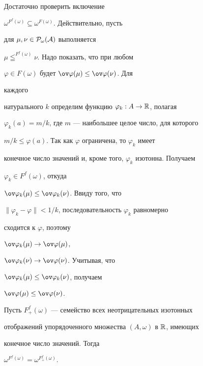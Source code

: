 \begin{pf} 


Достаточно проверить включение 


$\omega^{F^f(\omega)}\subseteq\omega^{F(\omega)}$. Действительно, пусть 


для $\mu,\nu\in\cal P_\omega(A)$ выполняется 


$\mu\leqq^{F^f(\omega)}\nu$. Надо показать, что при любом 


$\varphi\in F(\omega)$ будет $\ov\varphi(\mu)\le\ov\varphi(\nu)$. Для 


каждого 


натурального $k$ определим функцию $\varphi_k:A\to\Bbb R$, полагая 


$\varphi_k(a)=m/k$, где $m$ --- наибольшее целое число, для которого 


$m/k\le\varphi(a)$. Так как $\varphi$ ограничена, то $\varphi_k$ имеет 


конечное число значений и, кроме того, $\varphi_k$ изотонна. Получаем 


$\varphi_k\in F^f(\omega)$, откуда 


$\ov\varphi_k(\mu)\le\ov\varphi_k(\nu)$. Ввиду того, что 


$\|\varphi_k-\varphi\|<1/k$, последовательность $\varphi_k$ равномерно 


сходится к $\varphi$, поэтому 


$\ov\varphi_k(\mu)\to\ov\varphi(\mu)$, 


$\ov\varphi_k(\nu)\to\ov\varphi(\nu)$. Учитывая, что 


$\ov\varphi_k(\mu)\le\ov\varphi_k(\nu)$, получаем 


$\ov\varphi(\mu)\le\ov\varphi(\nu)$. 


\end{pf} 


 


\begin{lem} 


Пусть $F^f_+(\omega)$ --- семейство всех неотрицательных изотонных 


отображений упорядоченного множества $(A,\omega)$ в $\Bbb R$, имеющих 


конечное число значений. Тогда 


$\omega^{F^f(\omega)}=\omega^{F^f_+(\omega)}$. 


\end{lem} 


 


